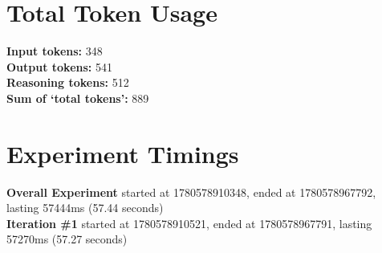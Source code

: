 \documentclass{article}
\begin{document}
\section*{Total Token Usage}
\textbf{Input tokens: }348
\\\textbf{Output tokens: }541
\\\textbf{Reasoning tokens: }512
\\\textbf{Sum of `total tokens': }889
\section*{Experiment Timings}
\textbf{Overall Experiment} started at 1780578910348, ended at 1780578967792, lasting 57444ms (57.44 seconds)
\\\textbf{Iteration \#1} started at 1780578910521, ended at 1780578967791, lasting 57270ms (57.27 seconds)
\end{document}
